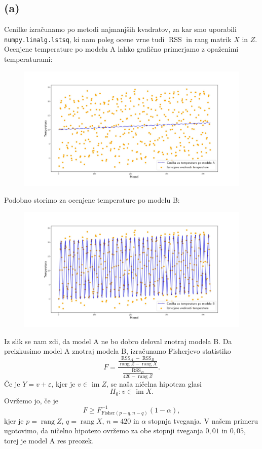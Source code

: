 \documentclass{article}
\DeclareMathOperator*{\rang}{rang}
\DeclareMathOperator*{\ima}{im}
\DeclareMathOperator*{\rss}{RSS}
\begin{document}
\subsection*{(a)}
Cenilke izračunamo po metodi najmanjših kvadratov, za kar smo uporabili \texttt{numpy.linalg.lstsq}, ki nam poleg ocene vrne tudi $\rss$ in rang matrik $X$ in $Z$. Ocenjene temperature po modelu A lahko grafično primerjamo z opaženimi temperaturami:
\begin{figure}[H]
    \centering
    \includegraphics[scale=0.4]{../rezultati/temperature_model_A.jpg}
\end{figure}
Podobno storimo za ocenjene temperature po modelu B:
\begin{figure}[H]
    \centering
    \includegraphics[scale=0.4]{../rezultati/temperature_model_B.jpg}
\end{figure}
Iz slik se nam zdi, da model A ne bo dobro deloval znotraj modela B. Da preizkusimo model A znotraj modela B, izračunamo Fisherjevo statistiko
\begin{equation*}
    F = \frac{\frac{\rss_A - \rss_B}{\rang Z - \rang X}}{\frac{\rss_B}{420 - \rang Z}}.
\end{equation*}
Če je $Y = v + \varepsilon$, kjer je $v \in \ima Z$, se naša ničelna hipoteza glasi
\begin{equation*}
    H_0 : v \in \ima X.
\end{equation*}
Ovržemo jo, če je
\begin{equation*}
    F \geq F^{-1}_{\text{Fisher}(p-q, n-q)}(1 - \alpha),
\end{equation*}
kjer je $p = \rang Z$, $q = \rang X$, $n = 420$ in $\alpha$ stopnja tveganja. V našem primeru ugotovimo, da ničelno hipotezo ovržemo za obe stopnji tveganja $0{,}01$ in $0{,}05$, torej je model A res preozek. 
\end{document}

